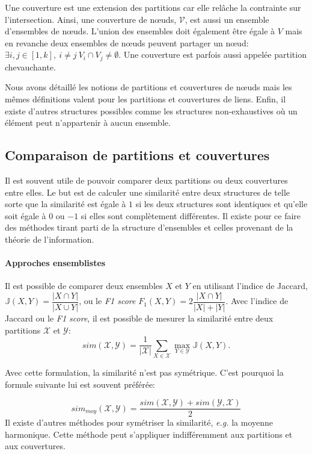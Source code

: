 Une couverture est une extension des partitions car elle relâche la contrainte sur l'intersection.
Ainsi, une couverture de n\oe{}uds, $\mathcal{V}$, est aussi un ensemble d'ensembles de n\oe{}uds.
L'union des ensembles doit également être égale à $V$ mais en revanche deux ensembles de n\oe{}uds peuvent partager un n\oe{}ud: $\exists i,j \in [1,k],\ i \neq j\ V_i \cap V_j \neq \emptyset$.
Une couverture est parfois aussi appelée partition chevauchante.

Nous avons détaillé les notions de partitions et couvertures de n\oe{}uds mais les mêmes définitions valent pour les partitions et couvertures de liens.
Enfin, il existe d'autres structures possibles comme les structures non-exhaustives où un élément peut n'appartenir à aucun ensemble.

\subsection{Comparaison de partitions et couvertures}
Il est souvent utile de pouvoir comparer deux partitions ou deux couvertures entre elles.
Le but est de calculer une similarité entre deux structures de telle sorte que la similarité est égale à $1$ si les deux structures sont identiques et qu'elle soit égale à $0$ ou $-1$ si elles sont complètement différentes.
Il existe pour ce faire des méthodes tirant parti de la structure d'ensembles et celles provenant de la théorie de l'information.

\paragraph{Approches ensemblistes}
\label{def:graphe_comparaison}
Il est possible de comparer deux ensembles $X$ et $Y$ en utilisant l'indice de Jaccard, $\mathbb{J}(X,Y) = \dfrac{|X \cap Y|}{|X \cup Y|}$, ou le \emph{F1 score} $F_1(X,Y) = 2\dfrac{|X \cap Y|}{|X| + |Y|}$.
Avec l'indice de Jaccard ou le \emph{F1 score}, il est possible de mesurer la similarité entre deux partitions $\mathcal{X}$ et $\mathcal{Y}$:
\begin{equation}
sim(\mathcal{X},\mathcal{Y})=\frac{1}{|\mathcal{X}|}\sum_{X \in \mathcal{X}}\max_{Y\in \mathcal{Y}}\mathbb{J}(X,Y).
\end{equation}

Avec cette formulation, la similarité n'est pas symétrique.
C'est pourquoi la formule suivante lui est souvent préférée:

\begin{equation}
sim_{moy}(\mathcal{X},\mathcal{Y}) = \dfrac{sim(\mathcal{X},\mathcal{Y})+sim(\mathcal{Y},\mathcal{X})}{2}
\end{equation}
Il existe d'autres méthodes pour symétriser la similarité, \emph{e.g.} la moyenne harmonique.
Cette méthode peut s'appliquer indifféremment aux partitions et aux couvertures.

